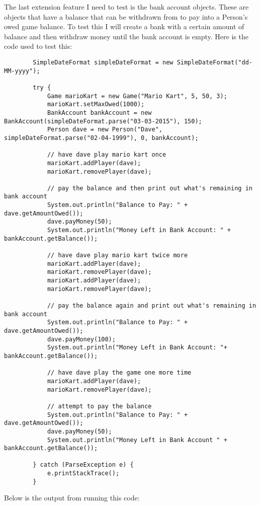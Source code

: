 \documentclass[a4paper]{article}
\begin{document}
The last extension feature I need to test is the bank account objects. These are objects that have a balance that can be withdrawn from to pay into a Person's owed game balance. To test this I will create a bank with a certain amount of balance and then withdraw money until the bank account is empty. Here is the code used to test this: \begin{lstlisting}
		SimpleDateFormat simpleDateFormat = new SimpleDateFormat("dd-MM-yyyy");

        try {
            Game marioKart = new Game("Mario Kart", 5, 50, 3);
            marioKart.setMaxOwed(1000);
            BankAccount bankAccount = new BankAccount(simpleDateFormat.parse("03-03-2015"), 150);
            Person dave = new Person("Dave", simpleDateFormat.parse("02-04-1999"), 0, bankAccount);

            // have dave play mario kart once
            marioKart.addPlayer(dave);
            marioKart.removePlayer(dave);

            // pay the balance and then print out what's remaining in bank account
            System.out.println("Balance to Pay: " + dave.getAmountOwed());
            dave.payMoney(50);
            System.out.println("Money Left in Bank Account: " + bankAccount.getBalance());

            // have dave play mario kart twice more
            marioKart.addPlayer(dave);
            marioKart.removePlayer(dave);
            marioKart.addPlayer(dave);
            marioKart.removePlayer(dave);

            // pay the balance again and print out what's remaining in bank account
            System.out.println("Balance to Pay: " + dave.getAmountOwed());
            dave.payMoney(100);
            System.out.println("Money Left in Bank Account: "+ bankAccount.getBalance());

            // have dave play the game one more time
            marioKart.addPlayer(dave);
            marioKart.removePlayer(dave);

            // attempt to pay the balance
            System.out.println("Balance to Pay: " + dave.getAmountOwed());
            dave.payMoney(50);
            System.out.println("Money Left in Bank Account " + bankAccount.getBalance());

        } catch (ParseException e) {
            e.printStackTrace();
        }
\end{lstlisting}
Below is the output from running this code: \newline
\end{document}
